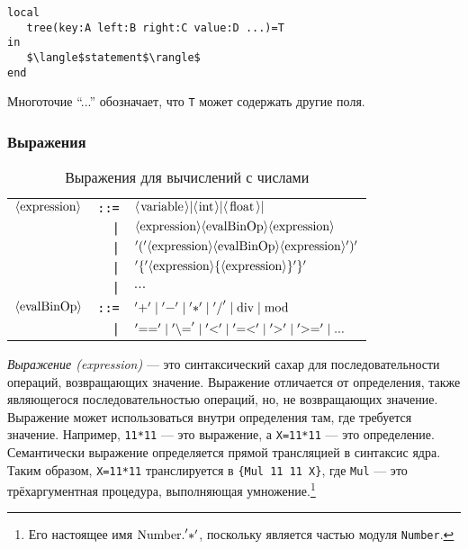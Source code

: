 \begin{lstlisting}
local
   tree(key:A left:B right:C value:D ...)=T
in
   $\langle$statement$\rangle$
end
\end{lstlisting}

Многоточие ``...'' обозначает, что \lstinline|T| может содержать другие поля.

\subsubsection{Выражения}

\begin{table}
  \begin{tabular}{|lrl|}
    \hline
    $\langle \text{\lstinline|expression|} \rangle$ & \lstinline|::=| & $\langle \text{\lstinline|variable|} \rangle | \langle \text{\lstinline|int|} \rangle | \langle \text{\lstinline|float|} \rangle |$\\
    & \lstinline!|! & $\langle \text{\lstinline|expression|} \rangle \langle \text{\lstinline|evalBinOp|} \rangle \langle \text{\lstinline|expression|} \rangle$\\
    & \lstinline!|! & $'(' \langle \text{\lstinline|expression|} \rangle \langle \text{\lstinline|evalBinOp|} \rangle \langle \text{\lstinline|expression|} \rangle ')'$\\
    & \lstinline!|! & $'\{' \langle \text{\lstinline|expression|} \rangle \{ \langle \text{\lstinline|expression|} \rangle \} '\}'$\\
    & \lstinline!|! & $...$\\
    $\langle \text{\lstinline|evalBinOp|} \rangle$ & \lstinline|::=| & $'\text{\lstinline|+|}' \;|\; '\text{\lstinline|-|}' \;|\; '\text{\lstinline|*|}' \;|\; '\text{\lstinline|/|}' \;|\; \text{\lstinline|div|} \;|\; \text{\lstinline|mod|}$\\
    & \lstinline!|! & $ '\text{\lstinline|==|}' \;|\; '\text{\lstinline|\\=|}' \;|\; '\text{\lstinline|<|}' \;|\; '\text{\lstinline|=<|}' \;|\; '\text{\lstinline|>|}' \;|\; '\text{\lstinline|>=|}' \;|\; ... $\\
    \hline
  \end{tabular}
  
\caption{Выражения для вычислений с числами}
\label{table:expressions_for_calculating_with_numbers}
\end{table}

\emph{Выражение (expression)} --- это синтаксический сахар для последовательности операций, возвращающих значение. Выражение отличается от определения, также являющегося последовательностью операций, но, не возвращающих значение. Выражение может использоваться внутри определения там, где требуется значение. Например, \lstinline|11*11| --- это выражение, а \lstinline|X=11*11| --- это определение. Семантически выражение определяется прямой трансляцией в синтаксис ядра. Таким образом, \lstinline|X=11*11| транслируется в \lstinline|{Mul 11 11 X}|, где \lstinline|Mul| --- это трёхаргументная процедура, выполняющая умножение.\footnote{Его настоящее имя $\text{\lstinline|Number.|} ' \text{\lstinline|*|} '$, поскольку является частью модуля \lstinline|Number|.}

